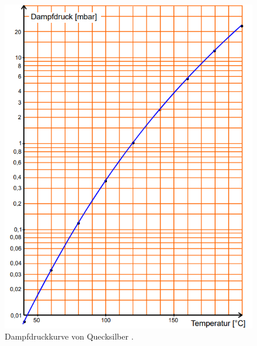 \begin{figure}[H]
    \centering
    \includegraphics[scale=0.8]{content/Dampfdruckkurve.png}
    \caption{Dampfdruckkurve von Quecksilber \cite{sample}.}
    \label{fig:Dampf}
\end{figure}

